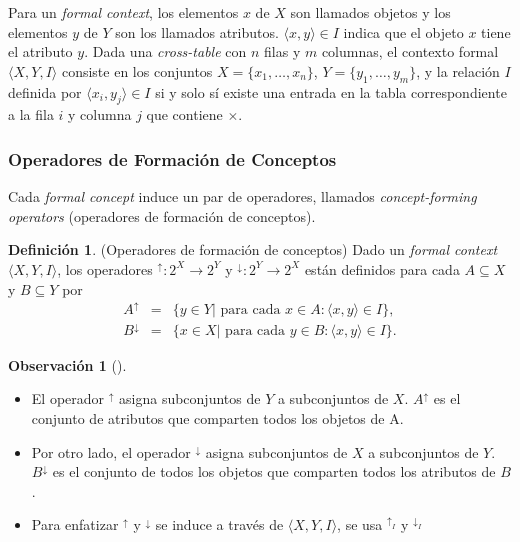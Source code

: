 \documentclass[12pt,oneside,letterpaper]{book}
\newcommand{\eng}[1]{\textit{#1}\xspace}			%
\theoremstyle{definition}
\newtheorem{definition}{Definición}[section]
\newtheorem{remark}{Observación}[section]
\begin{document}
Para un \eng{formal context}, los elementos $x$ de $X$ son llamados objetos y los elementos $y$ de $Y$ son los llamados atributos. $\langle x,y \rangle \in I$ indica que el objeto $x$ tiene el atributo $y$. Dada una \eng{cross-table} con $n$ filas y $m$ columnas, el contexto formal $\langle X,Y,I \rangle$ consiste en los conjuntos $X = \{x_1,\dots,x_n\}$, $Y = \{y_1,\dots,y_m\}$, y la relación $I$ definida por $\langle x_i,y_j \rangle \in I$ si y solo sí existe una entrada en la tabla correspondiente a la fila $i$ y columna $j$ que contiene $\times$. 

\subsubsection{Operadores de Formación de Conceptos}
\label{ssub:operadores_de_formacion_de_conceptos}
Cada \eng{formal concept} induce un par de operadores, llamados \eng{concept-forming operators} (operadores de formación de conceptos). 

\begin{definition}{(Operadores de formación de conceptos)}
Dado un \eng{formal context} $\langle X,Y,I \rangle$, los operadores $^{\uparrow}: 2^X \rightarrow 2^Y$ y $^{\downarrow}: 2^Y \rightarrow 2^X$ están definidos para cada $A \subseteq X$ y $B \subseteq Y$ por
\begin{eqnarray}
	A^{\uparrow} 	&=& \{y \in Y|\text{ para cada } x \in A: \langle x,y \rangle \in I\}, \nonumber \\
	B^{\downarrow} 	&=& \{x \in X|\text{ para cada } y \in B: \langle x,y \rangle \in I\}. \nonumber
\end{eqnarray}
\end{definition}

\begin{remark}[]
\begin{itemize}
	\item El operador $^{\uparrow}$ asigna subconjuntos de $Y$ a subconjuntos de $X$. $A^{\uparrow}$ es el conjunto de atributos que comparten todos los objetos de A.
	\item Por otro lado, el operador $^{\downarrow}$ asigna subconjuntos de $X$ a subconjuntos de $Y$. $B^{\downarrow}$ es el conjunto de todos los objetos que comparten todos los atributos de $B$.
	\item Para enfatizar $^{\uparrow}$ y $^{\downarrow}$ se induce a través de $\langle X,Y,I \rangle$, se usa $^{\uparrow_I}$ y $^{\downarrow_I}$
\end{itemize}
\end{remark}
\end{document}
